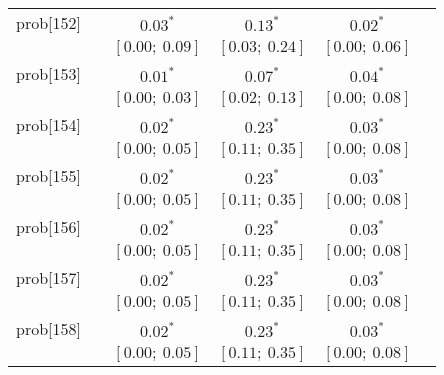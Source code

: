\begin{table}
\begin{center}
\begin{tabular}{l c c c c c }
prob[152]   &                                  & $0.03^{*}$                & $0.13^{*}$                & $0.02^{*}$              &                         \\
            &                                  & $[0.00;\ 0.09]$           & $[0.03;\ 0.24]$           & $[0.00;\ 0.06]$         &                         \\
prob[153]   &                                  & $0.01^{*}$                & $0.07^{*}$                & $0.04^{*}$              &                         \\
            &                                  & $[0.00;\ 0.03]$           & $[0.02;\ 0.13]$           & $[0.00;\ 0.08]$         &                         \\
prob[154]   &                                  & $0.02^{*}$                & $0.23^{*}$                & $0.03^{*}$              &                         \\
            &                                  & $[0.00;\ 0.05]$           & $[0.11;\ 0.35]$           & $[0.00;\ 0.08]$         &                         \\
prob[155]   &                                  & $0.02^{*}$                & $0.23^{*}$                & $0.03^{*}$              &                         \\
            &                                  & $[0.00;\ 0.05]$           & $[0.11;\ 0.35]$           & $[0.00;\ 0.08]$         &                         \\
prob[156]   &                                  & $0.02^{*}$                & $0.23^{*}$                & $0.03^{*}$              &                         \\
            &                                  & $[0.00;\ 0.05]$           & $[0.11;\ 0.35]$           & $[0.00;\ 0.08]$         &                         \\
prob[157]   &                                  & $0.02^{*}$                & $0.23^{*}$                & $0.03^{*}$              &                         \\
            &                                  & $[0.00;\ 0.05]$           & $[0.11;\ 0.35]$           & $[0.00;\ 0.08]$         &                         \\
prob[158]   &                                  & $0.02^{*}$                & $0.23^{*}$                & $0.03^{*}$              &                         \\
            &                                  & $[0.00;\ 0.05]$           & $[0.11;\ 0.35]$           & $[0.00;\ 0.08]$         &                         \\

\end{tabular}
\end{center}
\end{table}
